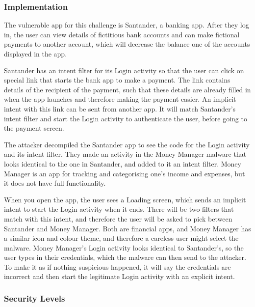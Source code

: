     \subsubsection{Implementation}
        \label{subsubsec:activity_hijack_implementation}
        
    The vulnerable app for this challenge is Santander, a banking app. After they log in, the user can view details of fictitious bank accounts and can make fictional payments to another account, which will decrease the balance one of the accounts displayed in the app.
    
    Santander has an intent filter for its Login activity so that the user can click on special link that starts the bank app to make a payment. The link contains details of the recipient of the payment, such that these details are already filled in when the app launches and therefore making the payment easier. An implicit intent with this link can be sent from another app. It will match Santander's intent filter and start the Login activity to authenticate the user, before going to the payment screen.

    The attacker decompiled the Santander app to see the code for the Login activity and its intent filter. They made an activity in the Money Manager malware that looks identical to the one in Santander, and added to it an intent filter. Money Manager is an app for tracking and categorising one's income and expenses, but it does not have full functionality.
    
    When you open the app, the user sees a Loading screen, which sends an implicit intent to start the Login activity when it ends. There will be two filters that match with this intent, and therefore the user will be asked to pick between Santander and Money Manager. Both are financial apps, and Money Manager has a similar icon and colour theme, and therefore a careless user might select the malware. Money Manager's Login activity looks identical to Santander's, so the user types in their credentials, which the malware can then send to the attacker. To make it as if nothing suspicious happened, it will say the credentials are incorrect and then start the legitimate Login activity with an explicit intent.
    
    \subsubsection{Security Levels}
        \label{subsubsec:activity_hijack_security_levels}
        
